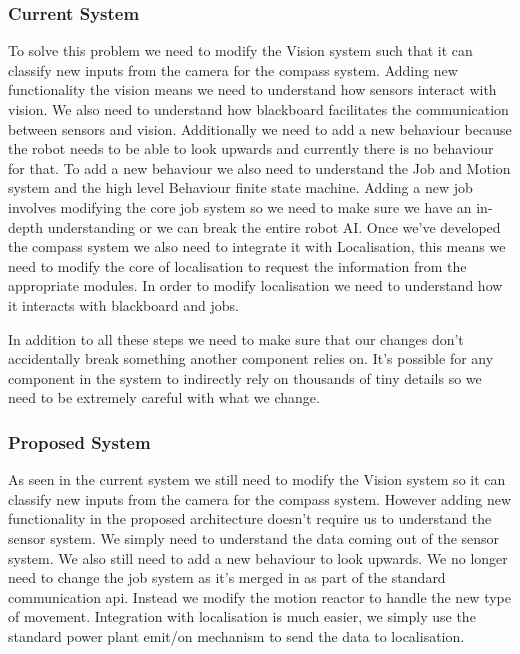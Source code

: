\documentclass[english,12pt]{scrartcl}
\begin{document}
			\subsubsection{Current System}
				To solve this problem we need to modify the Vision system such that it can classify new inputs
				from the camera for the compass system. 
				Adding new functionality the vision means we need to understand how sensors interact with vision. 
				We also need to understand how blackboard facilitates the communication between sensors and vision.
				Additionally we need to add a new behaviour because the robot needs to be able to look upwards and currently
				there is no behaviour for that.
				To add a new behaviour we also need to understand the Job and Motion system and the high level Behaviour finite state machine.
				Adding a new job involves modifying the core job system so we need to make sure we have an in-depth understanding
				or we can break the entire robot AI.
				Once we've developed the compass system we also need to integrate it with Localisation, this means we need to
				modify the core of localisation to request the information from the appropriate modules. In order to modify
				localisation we need to understand how it interacts with blackboard and jobs.
				
				In addition to all these steps we need to make sure that our changes don't accidentally break something another component
				relies on. It's possible for any component in the system to indirectly rely on thousands of tiny details so we need to be extremely
				careful with what we change.
				
			\subsubsection{Proposed System}
				As seen in the current system we still need to modify the Vision system so it can classify new inputs from
				the camera for the compass system. 
				However adding new functionality in the proposed architecture doesn't require us to understand the sensor system.
				We simply need to understand the data coming out of the sensor system.
				We also still need to add a new behaviour to look upwards. We no longer need to change the job system as it's merged
				in as part of the standard communication api. Instead we modify the motion reactor to handle the new type of movement.
				Integration with localisation is much easier, we simply use the standard power plant emit/on mechanism to send the data to localisation.
				
\end{document}
